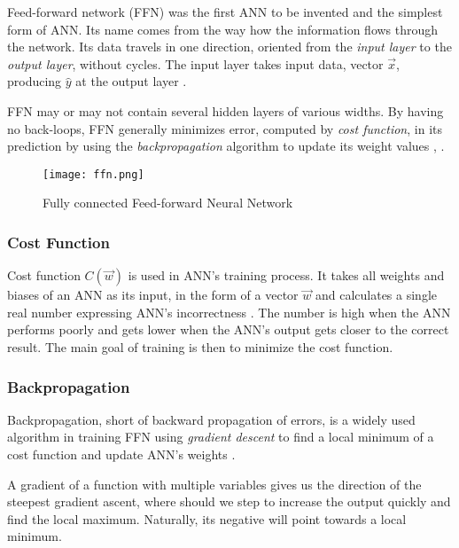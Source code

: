 Feed-forward network (FFN) was the first ANN to be invented and the simplest form of ANN. Its name comes from the way how the information flows through the network. Its data travels in one direction, oriented from the \textit{input layer} to the \textit{output layer}, without cycles. The input layer takes input data, vector $\vec{x}$, producing $\hat{y}$ at the output layer \cite{ffnbrilliant}.

FFN may or may not contain several hidden layers of various widths. By having no back-loops, FFN generally minimizes error, computed by \textit{cost function}, in its prediction by using the \textit{backpropagation} algorithm to update its weight values \cite{mainTypesANN}, \cite{lipton2015critical}.

\begin{figure}[h]
	\centering
    \texttt{[image: ffn.png]}
	\caption{Fully connected Feed-forward Neural Network \cite{matous}}
	\label{fig:ffn}
\end{figure}


\subsubsection{Cost Function}
Cost function $C(\vec{w})$ is used in ANN's training process. It takes all weights and biases of an ANN as its input, in the form of a vector $\vec{w}$ and calculates a single real number expressing ANN's incorrectness \cite{Goodfellow-et-al-2016}. The number is high when the ANN performs poorly and gets lower when the ANN's output gets closer to the correct result. The main goal of training is then to minimize the cost function. 

\subsubsection{Backpropagation}
Backpropagation, short of backward propagation of errors, is a widely used algorithm in training FFN using \textit{gradient descent} to find a local minimum of a cost function and update ANN's weights \cite{birlliantbackprop}.

A gradient of a function with multiple variables gives us the direction of the steepest gradient ascent, where should we step to increase the output quickly and find the local maximum. Naturally, its negative will point towards a local minimum. 

